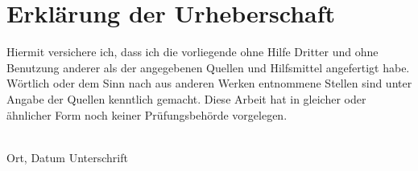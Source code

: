 \chapter*{Erklärung der Urheberschaft}
\vfill
Hiermit versichere ich, dass ich die vorliegende \Type{ }ohne Hilfe
Dritter und ohne Benutzung anderer als der angegebenen Quellen und Hilfsmittel
angefertigt habe. Wörtlich oder dem Sinn nach aus anderen Werken entnommene
Stellen sind unter Angabe der Quellen kenntlich gemacht. Diese Arbeit hat in
gleicher oder ähnlicher Form noch keiner Prüfungsbehörde vorgelegen.

\par\vfill\vfill\noindent
\hrulefill\hfill\hrulefill\\
Ort, Datum  \hfill Unterschrift\\


\newpage
\thispagestyle{empty}

